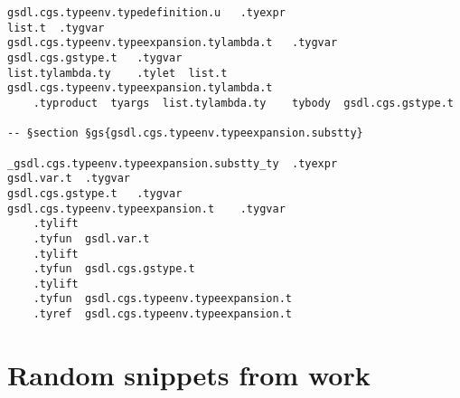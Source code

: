 \documentclass{report}
\begin{document}
\begin{verbatim}
gsdl.cgs.typeenv.typedefinition.u	.tyexpr
list.t	.tygvar
gsdl.cgs.typeenv.typeexpansion.tylambda.t	.tygvar
gsdl.cgs.gstype.t	.tygvar
list.tylambda.ty	.tylet	list.t	gsdl.cgs.typeenv.typeexpansion.tylambda.t
	.typroduct	tyargs	list.tylambda.ty	tybody	gsdl.cgs.gstype.t

-- §section §gs{gsdl.cgs.typeenv.typeexpansion.substty}

_gsdl.cgs.typeenv.typeexpansion.substty_ty	.tyexpr
gsdl.var.t	.tygvar
gsdl.cgs.gstype.t	.tygvar
gsdl.cgs.typeenv.typeexpansion.t	.tygvar
	.tylift
	.tyfun	gsdl.var.t
	.tylift
	.tyfun	gsdl.cgs.gstype.t
	.tylift
	.tyfun	gsdl.cgs.typeenv.typeexpansion.t
	.tyref	gsdl.cgs.typeenv.typeexpansion.t
\end{verbatim}

\chapter{Random snippets from work}
\end{document}
